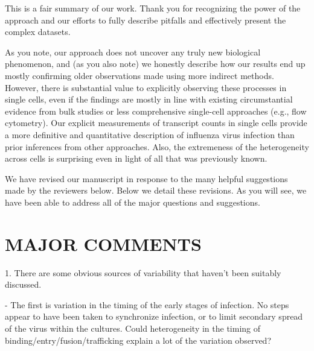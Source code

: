 \documentclass[11pt, oneside]{article}   	%
\begin{document}
{\color{black}
This is a fair summary of our work.
Thank you for recognizing the power of the approach and our efforts to fully describe pitfalls and effectively present the complex datasets.

As you note, our approach does not uncover any truly new biological phenomenon, and (as you also note) we honestly describe how our results end up mostly confirming older observations made using more indirect methods.
However, there is substantial value to explicitly observing these processes in single cells, even if the findings are mostly in line with existing circumstantial evidence from bulk studies or less comprehensive single-cell approaches (e.g., flow cytometry).
Our explicit measurements of transcript counts in single cells provide a more definitive and quantitative description of influenza virus infection than prior inferences from other approaches.
Also, the extremeness of the heterogeneity across cells is surprising even in light of all that was previously known.

We have revised our manuscript in response to the many helpful suggestions made by the reviewers below.
Below we detail these revisions.
As you will see, we have been able to address all of the major questions and suggestions.
}

\section*{MAJOR COMMENTS} 

1. There are some obvious sources of variability that haven't been suitably discussed. 

- The first is variation in the timing of the early stages of infection. No steps appear to have been taken to synchronize infection, or to limit secondary spread of the virus within the cultures. Could heterogeneity in the timing of binding/entry/fusion/trafficking explain a lot of the variation observed? 
\end{document}

